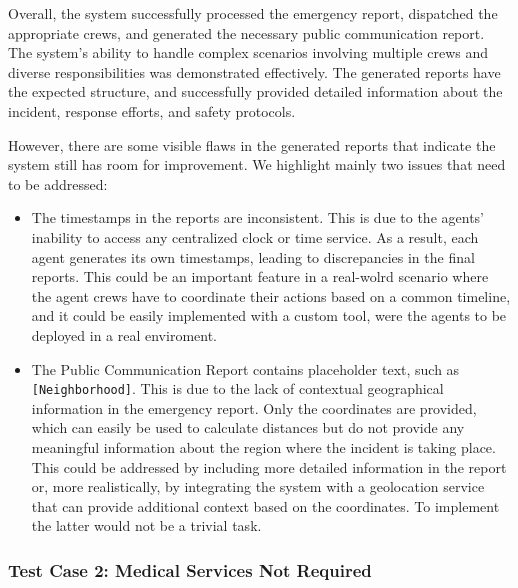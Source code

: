 Overall, the system successfully processed the emergency report, dispatched the appropriate crews, and generated the necessary public communication report. The system's ability to handle complex scenarios involving multiple crews and diverse responsibilities was demonstrated effectively. The generated reports have the expected structure, and successfully provided detailed information about the incident, response efforts, and safety protocols.

However, there are some visible flaws in the generated reports that indicate the system still has room for improvement. We highlight mainly two issues that need to be addressed:
\begin{itemize}
    \item The timestamps in the reports are inconsistent. This is due to the agents' inability to access any centralized clock or time service. As a result, each agent generates its own timestamps, leading to discrepancies in the final reports. This could be an important feature in a real-wolrd scenario where the agent crews have to coordinate their actions based on a common timeline, and it could be easily implemented with a custom tool, were the agents to be deployed in a real enviroment.
    \item The Public Communication Report contains placeholder text, such as \texttt{[Neighborhood]}. This is due to the lack of contextual geographical information in the emergency report. Only the coordinates are provided, which can easily be used to calculate distances but do not provide any meaningful information about the region where the incident is taking place. This could be addressed by including more detailed information in the report or, more realistically, by integrating the system with a geolocation service that can provide additional context based on the coordinates. To implement the latter would not be a trivial task.
\end{itemize}

\subsubsection{Test Case 2: Medical Services Not Required}

